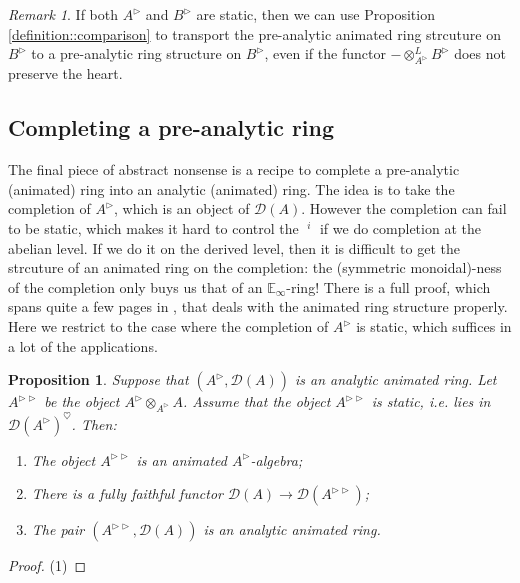 \documentclass{article}
\theoremstyle{plain}
\newtheorem{prop}[thm]{Proposition}
\theoremstyle{definition}
\theoremstyle{remark}
\newtheorem{rmk}[thm]{Remark}
\DeclareMathOperator{\exts}{\underline{Ext}}
\newcommand{\dten}{\otimes ^{L}}
\newcommand{\huflag}{\triangleright}
\newcommand{\D}{\mathcal{D}}
\newcommand{\heart}{\heartsuit}
\begin{document}
\begin{rmk}
If both $ A ^{\huflag} $ and $ B ^{\huflag} $ are static, then we can use Proposition \ref{definition::comparison} to transport the
pre-analytic animated ring strcuture on $ B ^{\huflag} $ to a pre-analytic ring structure on $ B ^{\huflag} $,
even if the functor $ -\dten _{A ^{\huflag}}B ^{\huflag} $ does not preserve the heart.
\end{rmk}

\subsection{Completing a pre-analytic ring}

The final piece of abstract nonsense is a recipe to complete a pre-analytic (animated) ring into an analytic (animated) ring.
The idea is to take the completion of $ A ^{\huflag} $, which is an object of $ \D (A) $.
However the completion can fail to be static, which makes it hard to control the $ \exts ^{i} $ if we do completion at the abelian level.
If we do it on the derived level, then it is difficult to get the strcuture of an animated ring on the completion:
the (symmetric monoidal)-ness of the completion only buys us that of an $ \mathbb{E}_{\infty} $-ring!
There is a full proof, which spans quite a few pages in \cite{rodriguez-camargo_notes_nodate},
that deals with the animated ring structure properly.
Here we restrict to the case where the completion of $ A ^{\huflag} $ is static,
which suffices in a lot of the applications.
\begin{prop}
Suppose that $ (A ^{\huflag}, \D (A)) $ is an analytic animated ring.
Let $ A ^{\huflag\huflag} $ be the object $ A ^{\huflag} \otimes _{A ^{\huflag}} A $.
Assume that the object $ A ^{\huflag\huflag} $ is static, i.e. lies in $ \D (A ^{\huflag})^{\heart} $.
Then:
\begin{enumerate}
\item The object $ A ^{\huflag\huflag} $ is an animated $ A ^{\huflag} $-algebra;
\item There is a fully faithful functor $ \D (A)\to \D (A ^{\huflag\huflag}) $;
\item The pair $ (A ^{\huflag\huflag}, \D (A)) $ is an analytic animated ring.
\end{enumerate}
\end{prop}

\begin{proof}
(1)

\end{proof}
\end{document}
